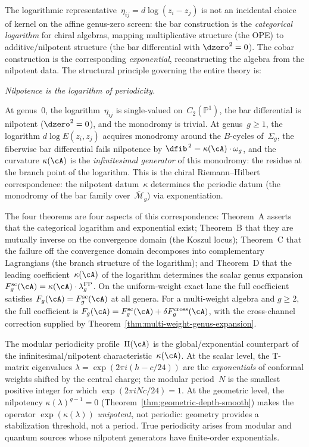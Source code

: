 \begin{remark}
\label{rem:nilpotence-periodicity}
The logarithmic representative~$\eta_{ij}=d\log(z_i-z_j)$ is not an
incidental choice of kernel on the affine genus-zero screen: the bar construction is the
\emph{categorical logarithm} for chiral algebras, mapping
multiplicative structure (the OPE) to additive/nilpotent structure
(the bar differential with $\dzero^2 = 0$). The cobar construction
is the corresponding \emph{exponential}, reconstructing the algebra
from the nilpotent data. The structural principle governing the
entire theory is:
\begin{center}
\emph{Nilpotence is the logarithm of periodicity.}
\end{center}
At genus~$0$, the logarithm~$\eta_{ij}$ is single-valued
on~$C_2(\mathbb{P}^1)$, the bar differential is nilpotent
($\dzero^2 = 0$), and the monodromy is trivial. At
genus~$g \geq 1$, the logarithm $d\log E(z_i,z_j)$ acquires
monodromy around the $B$-cycles of~$\Sigma_g$, the fiberwise bar
differential fails nilpotence by
$\dfib^{\,2} = \kappa(\cA)\cdot\omega_g$, and the curvature
$\kappa(\cA)$ is the \emph{infinitesimal generator} of this
monodromy: the residue at the branch point of the logarithm.
This is the chiral Riemann--Hilbert correspondence: the nilpotent
datum~$\kappa$ determines the periodic datum (the monodromy of the
bar family over~$\overline{\mathcal{M}}_g$) via exponentiation.

The four theorems are four aspects of this correspondence:
Theorem~A asserts that the categorical logarithm and exponential
exist; Theorem~B that they are mutually inverse on the
convergence domain (the Koszul locus); Theorem~C that the failure
off the convergence domain decomposes into complementary
Lagrangians (the branch structure of the logarithm); and
Theorem~D that the leading coefficient~$\kappa(\cA)$ of the
logarithm determines the scalar genus expansion
$F_g^{\mathrm{sc}}(\cA)=\kappa(\cA)\cdot\lambda_g^{\mathrm{FP}}$.
On the uniform-weight exact lane the full coefficient satisfies
$F_g(\cA)=F_g^{\mathrm{sc}}(\cA)$ at all genera. For a multi-weight
algebra and $g\geq2$, the full coefficient is
$F_g(\cA)=F_g^{\mathrm{sc}}(\cA)+\delta F_g^{\mathrm{cross}}(\cA)$,
with the cross-channel correction supplied by
Theorem~\ref{thm:multi-weight-genus-expansion}.

The modular periodicity profile~$\Pi(\cA)$ is the
global/exponential counterpart of the infinitesimal/nilpotent
characteristic~$\kappa(\cA)$. At the scalar level, the T-matrix
eigenvalues $\lambda = \exp(2\pi i(h - c/24))$ are the
\emph{exponentials} of conformal weights shifted by the central
charge; the modular period~$N$ is the smallest positive integer for
which $\exp(2\pi i N c/24) = 1$. At the geometric level, the
nilpotency $\kappa(\lambda)^{g-1} = 0$
(Theorem~\ref{thm:geometric-depth-smooth}) makes the operator
$\exp(\kappa(\lambda))$ \emph{unipotent}, not periodic: geometry
provides a stabilization threshold, not a period. True periodicity
arises from modular and quantum sources whose nilpotent generators
have finite-order exponentials.
\end{remark}

